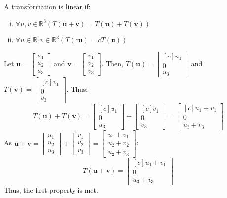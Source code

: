 \documentclass[11pt]{scrartcl}
\theoremstyle{dotlessP}
\theoremstyle{dotlessN}
\newcommand{\reals}{\mathbb{R}} %
\begin{document}
A transformation is linear if:
\begin{enumerate}[i.]
	\item $\forall u, v \in \reals^3(T(\bm{u} + \bm{v}) = T(\bm{u}) + T(\bm{v}))$ 
	\item $\forall u \in \reals, v \in \reals^3(T(c\bm{u}) = cT(\bm{u}))$
\end{enumerate}
Let $\bm{u} = 
\begin{bmatrix}
	u_1 \\
	u_2 \\
	u_3
\end{bmatrix}
$ and $\bm{v} = 
\begin{bmatrix}
	v_1 \\
	v_2 \\
	v_3
\end{bmatrix}
$. Then, $T(\bm{u}) = 
\begin{bmatrix}[c]
	u_1 \\
	0 \\
	u_3
\end{bmatrix}
$ and $T(\bm{v}) = 
\begin{bmatrix}[c]
	v_1 \\
	0 \\
	v_3
\end{bmatrix}
$. Thus: 
\[
T(\bm{u}) + T(\bm{v}) = \begin{bmatrix}[c]
	u_1 \\
	0 \\
	u_3
\end{bmatrix} +
\begin{bmatrix}[c]
	v_1 \\
	0 \\
	v_3
\end{bmatrix} =
\begin{bmatrix}[c]
	u_1 + v_1 \\
	0 \\
	u_3 + v_3
\end{bmatrix}
\] 
As $\bm{u} + \bm{v} = 
\begin{bmatrix}
	u_1 \\
	u_2 \\
	u_3
\end{bmatrix} +
\begin{bmatrix}
	v_1 \\
	v_2 \\
	v_3
\end{bmatrix} = 
\begin{bmatrix}
	u_1 + v_1 \\
	u_2 + v_2 \\
	u_3 + v_3
\end{bmatrix} 
$:
\[
	T(\bm{u} + \bm{v}) = 
	\begin{bmatrix}[c]
		u_1 + v_1 \\
		0 \\
		u_3 + v_3
	\end{bmatrix}
\]
Thus, the first property is met.
\\
\end{document}
